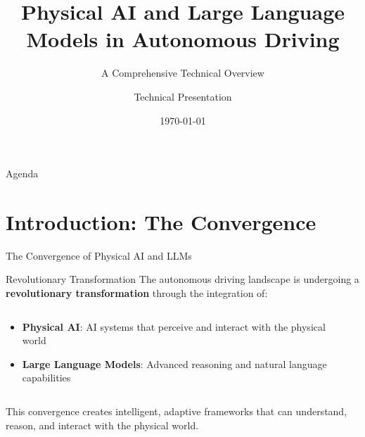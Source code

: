\documentclass[aspectratio=169]{beamer}
\title[Physical AI \& LLMs in Autonomous Driving]{Physical AI and Large Language Models in Autonomous Driving}
\subtitle{A Comprehensive Technical Overview}
\author{Technical Presentation}
\institute{Based on comprehensive research document}
\date{\today}
\newcommand{\highlight}[1]{\textcolor{teslaBlue}{\textbf{#1}}}
\begin{document}
\begin{frame}
    \titlepage
\end{frame}

\begin{frame}{Agenda}
    \tableofcontents
\end{frame}

\section{Introduction: The Convergence}

\begin{frame}{The Convergence of Physical AI and LLMs}
    \begin{block}{Revolutionary Transformation}
        The autonomous driving landscape is undergoing a \highlight{revolutionary transformation} through the integration of:
    \end{block}
    
    \begin{columns}
        \begin{column}{0.5\textwidth}
            \begin{itemize}
                \item \textbf{Physical AI}: AI systems that perceive and interact with the physical world
                \item \textbf{Large Language Models}: Advanced reasoning and natural language capabilities
            \end{itemize}
        \end{column}
        \begin{column}{0.5\textwidth}
        \end{column}
    \end{columns}
    
    \vspace{0.5cm}
    This convergence creates intelligent, adaptive frameworks that can understand, reason, and interact with the physical world.
\end{frame}
\end{document}
